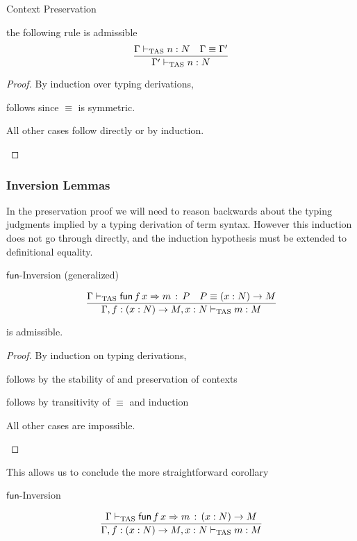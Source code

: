 \begin{lem}
Context Preservation
 
the following rule is admissible
\[
\frac{\Gamma\vdash_{\mathrm{TAS}} n:N\quad\Gamma\equiv\Gamma'}{\Gamma'\vdash_{\mathrm{TAS}} n:N}
\]
\end{lem}
 
\begin{proof}
By induction over typing derivations,
 
\begin{casenv}
 \item {} follows since $\equiv$ is symmetric.
 \item All other cases follow directly or by induction.
\end{casenv}
\end{proof}
 
\subsubsection{Inversion Lemmas}
In the preservation proof we will need to reason backwards about the typing judgments implied by a typing derivation of term syntax.
However this induction does not go through directly, and the induction hypothesis must be extended to definitional equality. 
 
\begin{lem}
$\mathsf{fun}$-Inversion (generalized)
 
\[
\frac{\Gamma\vdash_{\mathrm{TAS}}\mathsf{fun}\,f\,x\Rightarrow m\,:\,P\quad P\equiv\left(x:N\right)\rightarrow M}{\Gamma,f:\left(x:N\right)\rightarrow M,x:N\vdash_{\mathrm{TAS}} m:M}
\]
 
is admissible.
\end{lem}
 
\begin{proof}
By induction on typing derivations,
 
\begin{casenv}
 \item {} follows by the stability of  and preservation of contexts
 \item {} follows by transitivity of $\equiv$ and induction
 \item All other cases are impossible.
\end{casenv}
 
\end{proof}
This allows us to conclude the more straightforward corollary
\begin{cor}
$\mathsf{fun}$-Inversion
 
\[
\frac{\Gamma\vdash_{\mathrm{TAS}}\mathsf{fun}\,f\,x\Rightarrow m\,:\,\left(x:N\right)\rightarrow M}{\Gamma,f:\left(x:N\right)\rightarrow M,x:N\vdash_{\mathrm{TAS}} m:M}
\]
\end{cor}
 
